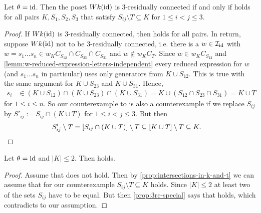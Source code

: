 \begin{prop}
	Let $\theta = \operatorname{id}$. Then the poset $Wk(\operatorname{id})$ is 3-residually connected if and only if  holds for all pairs $K,S_1,S_2,S_3$ that satisfy $S_{ij} \setminus T \subseteq K$ for $1 \leq i < j \leq 3$.

	\begin{proof}
		If $Wk(\operatorname{id})$ is 3-residually connected, then  holds for all pairs. In return, suppose $Wk(\operatorname{id})$ not to be 3-residually connected, i.e. there is a $w \in \mathcal{I}_{\operatorname{id}}$ with $w = s_1 \ldots s_n \in w_K C_{S_{12}} \cap C_{S_{23}} \cap C_{S_{31}}$ and $w \notin w_K C_T$. Since $w \in w_K C_{S_{12}}$ and \ref{lemm:w-reduced-expression-letters-independent} every reduced expression for $w$ (and $s_1 \ldots s_n$ in particular) uses only generators from $K \cup S_{12}$. This is true with the same argument for $K \cup S_{23}$ and $K \cup S_{31}$. Hence,
		\begin{align*}
			s_i	& \in (K \cup S_{12}) \cap (K \cup S_{23}) \cap (K \cup S_{31}) = K \cup (S_{12} \cap S_{23} \cap S_{31}) = K \cup T
		\end{align*}
		for $1 \leq i \leq n$. So our counterexample to  is also a counterexample if we replace $S_{ij}$ by $S'_{ij} := S_{ij} \cap (K \cup T)$ for $1 \leq i < j \leq 3$. But then
		\begin{align*}
			S'_{ij} \setminus T & = [S_{ij} \cap (K \cup T)] \setminus T \subseteq [K \cup T] \setminus T \subseteq K. \qedhere
		\end{align*}
	\end{proof}
\end{prop}

\begin{coro}
	Let $\theta = \operatorname{id}$ and $|K| \leq 2$. Then  holds.

	\begin{proof}
		Assume that  does not hold. Then by \ref{prop:intersections-in-k-and-t} we can assume that for our counterexample $S_{ij} \setminus T \subseteq K$ holds. Since $|K| \leq 2$ at least two of the sets $S_{ij}$ have to be equal. But then \ref{prop:3rc-special} says that  holds, which contradicts to our assumption.
	\end{proof}
\end{coro}